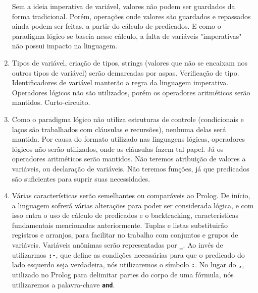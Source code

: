 \documentclass[12pt, a4paper]{article}
\newcommand{\inlinecode}[1]{\textbf{\lstinline{#1}}}
\begin{document}
\begin{enumerate}[leftmargin=*]
        Sem a ideia imperativa de variável, valores não podem ser guardados da
        forma tradicional. Porém, operações onde valores são guardados e
        repassados ainda podem ser feitas, a partir do cálculo de predicados. E
        como o paradigma lógico se baseia nesse cálculo, a falta de variáveis
        "imperativas" não possui impacto na linguagem.

        \item
        Tipos de variável, criação de tipos, strings (valores que não se
        encaixam nos outros tipos de variável) serão demarcadas por aspas.
        Verificação de tipo.  Identificadores de variável manterão a regra da
        linguagem imperativa.  Operadores lógicos não são utilizados, porém os
        operadores aritméticos serão mantidos. Curto-circuito.

        \item
        Como o paradigma lógico não utiliza estruturas de controle
        (condicionais e laços são trabalhados com cláusulas e recursões),
        nenhuma delas será mantida. Por causa do formato utilizado nas
        linguagens lógicas, operadores lógicos não serão utilizados, onde as
        cláusulas fazem tal papel. Já os operadores aritméticos serão mantidos.
        Não teremos atribuição de valores a variáveis, ou declaração de
        variáveis. Não teremos funções, já que predicados são suficientes para
        suprir suas necessidades.

        \item
        Várias características serão semelhantes ou comparáveis ao Prolog. De
        início, a linguagem sofrerá várias alterações para poder ser
        considerada lógica, e com isso entra o uso de cálculo de predicados e o
        backtracking, características fundamentais mencionadas anteriormente.
        Tuplas e listas substituirão registros e arranjos, para facilitar no
        trabalho com conjuntos e grupos de variáveis. Variáveis anônimas serão
        representadas por \inlinecode{_}. Ao invés de utilizarmos
        \inlinecode{:-}, que define as condições necessárias para que o
        predicado do lado esquerdo seja verdadeira, nós utilizaremos o símbolo
        \inlinecode{:}. No lugar do \inlinecode{,}, utilizado no Prolog para
        delimitar partes do corpo de uma fórmula, nós utilizaremos a
        palavra-chave \inlinecode{and}.


\end{enumerate}
\end{document}

